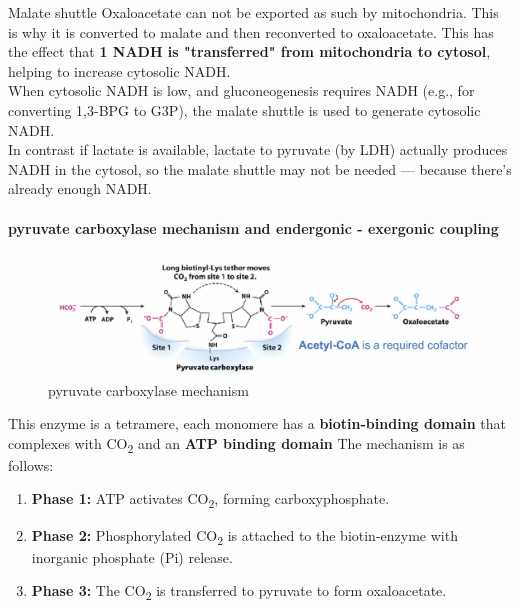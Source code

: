 \documentclass[../main.tex]{subfiles}
\begin{document}
\begin{RemarkWithTitel}{Malate shuttle}
	    Oxaloacetate can not be exported as such by mitochondria. This is why it is converted to malate and then reconverted to oxaloacetate. This has the effect that \textbf{1 NADH is "transferred" from mitochondria to cytosol}, helping to increase cytosolic NADH.\\
	    \indent When cytosolic NADH is low, and gluconeogenesis requires NADH (e.g., for converting 1,3-BPG to G3P), the malate shuttle is used to generate cytosolic NADH.\\
	    \indent In contrast if lactate is available, lactate to pyruvate (by LDH) actually produces NADH in the cytosol, so the malate shuttle may not be needed — because there's already enough NADH.
\end{RemarkWithTitel}

\paragraph{pyruvate carboxylase mechanism and endergonic - exergonic coupling }
\begin{figure}[H]
    \centering
    \includegraphics[width=\linewidth]{pyruvateCarboxylase.png}
    \caption{pyruvate carboxylase mechanism}
    \label{fig:enter-label}
\end{figure}
This enzyme is a tetramere, each monomere has a\textbf{ biotin-binding domain} that complexes with CO\textsubscript{2}  and an \textbf{ATP binding domain} The mechanism is as follows:

\begin{enumerate}
    \item \textbf{Phase 1:} ATP activates CO\textsubscript{2}, forming carboxyphosphate.
    \item \textbf{Phase 2:} Phosphorylated CO\textsubscript{2} is attached to the biotin-enzyme with inorganic phosphate (Pi) release.
    \item \textbf{Phase 3:} The CO\textsubscript{2} is transferred to pyruvate to form oxaloacetate.
\end{enumerate}
\end{document}

